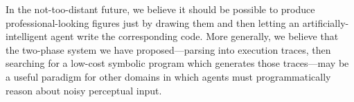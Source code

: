\documentclass{article}
\begin{document}
In the not-too-distant future, we believe it should be possible to produce professional-looking figures just by drawing them and then letting an artificially-intelligent agent write the corresponding code.
More generally, we believe that the two-phase system we have proposed---parsing into execution traces, then searching for a low-cost symbolic program which generates those traces---may be a useful paradigm for other domains in which agents must programmatically reason about noisy perceptual input.



%



{\small }
\end{document}

